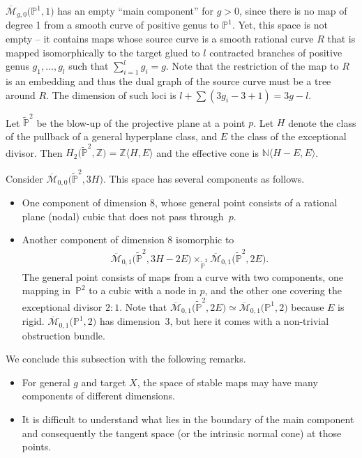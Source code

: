 \documentclass[pdftex]{sigma}
\numberwithin{equation}{section}
\newcommand{\PP}{\mathbb P}
\begin{document}
\begin{Example}$\overline{{\mathcal M}}_{g,0}\big({\mathbb P}^1,1\big)$
has an empty ``main component'' for $g>0$, since there is no map of degree 1 from a smooth curve of positive genus to $\mathbb P^1$. Yet, this space is not empty -- it contains maps whose source curve is a smooth rational curve $R$ that is mapped isomorphically to the target glued to $l$ contracted branches of positive genus $g_1,\ldots,g_l$ such that $\sum\limits_{i=1}^l g_i=g$. Note that the restriction of the map to $R$ is an embedding and thus the dual graph of the source curve must be a tree around $R$. The dimension of such loci is $l+\sum(3g_i-3+1)=3g-l$.
\end{Example}
\begin{Example}
Let $\tilde{\mathbb P}^2$ be the blow-up of the projective plane at a point $p$. Let $H$ denote the class of the pullback of a general hyperplane class, and $E$ the class of the exceptional divisor. Then $H_2\big(\tilde{\mathbb P}^2,\mathbb Z\big)=\mathbb Z\langle H,E\rangle$ and the effective cone is $\mathbb N\langle H-E, E\rangle$.

Consider
$\overline{{\mathcal M}}_{0,0}\big(\tilde{\mathbb P}^2,3H\big)$. This space has several components as follows.
\begin{itemize}\itemsep=0pt
\item One component of dimension 8, whose general point consists of a rational plane (nodal) cubic that does not pass through~$p$.

\item Another component of dimension 8 isomorphic to
\begin{gather*}
\overline{{\mathcal M}}_{0,1}\big(\tilde{\mathbb P}^2,3H-2E\big)
\times_{\tilde{\mathbb P}^2}
\overline{{\mathcal M}}_{0,1}\big(\tilde{\mathbb P}^2,2E\big).
\end{gather*} The general point consists of maps from a curve with two components, one mapping in~$\PP^2$ to a cubic with a node in $p$, and the other one covering the exceptional divisor $2:1$. Note that $\overline{{\mathcal M}}_{0,1}\big(\tilde{\mathbb P}^2,2E\big)
\simeq \overline{{\mathcal M}}_{0,1}\big({\mathbb P}^1,2\big) $ because $E$ is rigid. $
\overline{{\mathcal M}}_{0,1}\big({\mathbb P}^1,2\big)$ has dimension~3, but here it comes with a non-trivial obstruction bundle.
\end{itemize}
\end{Example}
\begin{Remark}We conclude this subsection with the following remarks.
\begin{itemize}\itemsep=0pt
 \item For general $g$ and target $X$, the space of stable maps may have many components of different dimensions.
 \item It is difficult to understand what lies in the boundary of the main component and consequently the tangent space (or the intrinsic normal cone) at those points.
\end{itemize}
\end{Remark}
\end{document}
